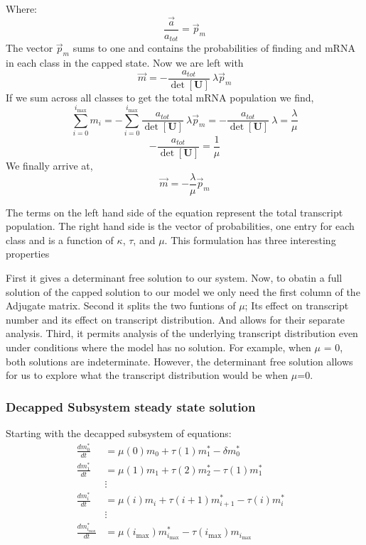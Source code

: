 \documentclass[review]{elsarticle}
\newcommand{\imax}{\ensuremath{i_{\max}}\xspace}
\let\bs\boldsymbol
\begin{document}
Where:
	\begin{equation*}
		\frac{\vec{a}}{a_{tot}} = \vec{p}_m
	\end{equation*}
The vector $\vec{p}_m$ sums to one and contains the probabilities of finding and mRNA in each class in the capped state. Now we are left with
	\begin{equation*}
		\vec{m}=-\frac{a_{tot}}{\det[\bs{U}]} \: \lambda\vec{p}_m
	\end{equation*}
If we sum across all classes to get the total mRNA population we find,
	\begin{equation*}
		\sum_{i=0}^{\imax}m_{i} =-\sum_{i=0}^{\imax} \frac{a_{tot}}{\det[\bs{U}]} \: \lambda\vec{p}_m =-\frac{a_{tot}}{\det[\bs{U}]} \: \lambda = \frac{\lambda}{\mu}
	\end{equation*}
	\begin{equation*}
		-\frac{a_{tot}}{\det[\bs{U}]} = \frac{1}{\mu}
	\end{equation*}
We finally arrive at,
	\begin{equation*}
		\vec{m}=- \frac{\lambda}{\mu}\vec{p}_m
	\end{equation*}


The terms on the left hand side of the equation represent the total transcript population. The right hand side is the vector of probabilities, one entry for each class and is a function of $\kappa$, $\tau$, and $\mu$.
This formulation has three interesting properties

First it gives a determinant free solution to our system. Now, to obatin a full solution of the capped solution to our model we only need the first column of the Adjugate matrix.
Second it splits the two funtions of $\mu$; Its effect on transcript number and its effect on transcript distribution. And allows for their separate analysis.
Third, it permits analysis of the underlying transcript distribution even under conditions where the model has no solution. For example, when $\mu$ = 0, both solutions are indeterminate. However, the determinant free solution allows for us to explore what the transcript distribution would be when $\mu$=0.
	

\subsubsection{Decapped Subsystem steady state solution}

Starting with the decapped subsystem of equations:
\begin{align*}
\frac{dm_{0}^{*}}{dt} &= \mu(0)m_{0}+\tau(1)m_{1}^{*}-\delta m_{0}^{*} \\
\frac{dm_{1}^{*}}{dt} &= \mu(1)m_{1}+\tau(2)m_{2}^{*}-\tau(1)m_{1}^{*} \\
& \vdots & \\
\frac{dm_{i}^{*}}{dt} &= \mu(i)m_{i}+\tau(i+1)m_{i+1}^{*}-\tau(i)m_{i}^{*} \\
& \vdots & \\
\frac{dm_{\imax}^{*}}{dt} &= \mu(\imax)m_{\imax}^{*}-\tau(\imax)m_{\imax} \\
\end{align*}
\end{document}
